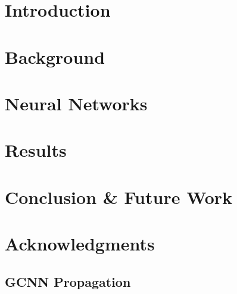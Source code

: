 


	
	\newpage
	\section{Introduction}\label{sec:Intro}
	

	\section{Background}\label{sec:BG}
	

	\section{Neural Networks}\label{sec:NN}
	


	\section{Results}\label{sec:Results}
	

	\section{Conclusion \& Future Work}\label{sec:Conc}
	

	\section{Acknowledgments}\label{sec:Acknow}
	

	\newpage
	\begin{appendices}
	\section{GCNN Propagation}\label{app:GCNN-Prop}
	
	\end{appendices}

	\newpage
	
	

